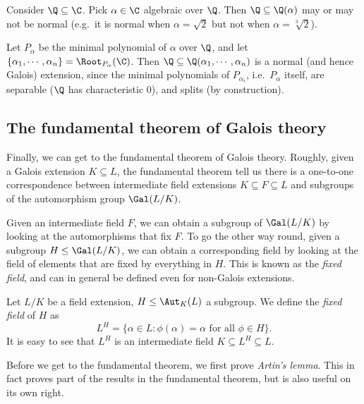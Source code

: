 \documentclass[a4paper]{article}
\begin{document}
\begin{eg}
  Consider $\Q \subseteq \C$. Pick $\alpha \in \C$ algebraic over $\Q$. Then $\Q \subseteq \Q(\alpha)$ may or may not be normal (e.g.\ it is normal when $\alpha = \sqrt{2}$ but not when $\alpha = \sqrt[3]{2}$).

  Let $P_\alpha$ be the minimal polynomial of $\alpha$ over $\Q$, and let $\{\alpha_1, \cdots, \alpha_n\} = \Root_{P_\alpha}(\C)$. Then $\Q\subseteq \Q(\alpha_1, \cdots, \alpha_n)$ is a normal (and hence Galois) extension, since the minimal polynomials of $P_{\alpha_i}$, i.e.\ $P_\alpha$ itself, are separable ($\Q$ has characteristic 0), and splits (by construction).
\end{eg}
\subsection{The fundamental theorem of Galois theory}
Finally, we can get to the fundamental theorem of Galois theory. Roughly, given a Galois extension $K \subseteq L$, the fundamental theorem tell us there is a one-to-one correspondence between intermediate field extensions $K \subseteq F \subseteq L$ and subgroups of the automorphism group $\Gal(L/K)$.

Given an intermediate field $F$, we can obtain a subgroup of $\Gal(L/K)$ by looking at the automorphisms that fix $F$. To go the other way round, given a subgroup $H \leq \Gal(L/K)$, we can obtain a corresponding field by looking at the field of elements that are fixed by everything in $H$. This is known as the \emph{fixed field}, and can in general be defined even for non-Galois extensions.

\begin{defi}
  Let $L/K$ be a field extension, $H\leq \Aut_K(L)$ a subgroup. We define the \emph{fixed field} of $H$ as
  \[
    L^H = \{\alpha \in L: \phi(\alpha) = \alpha\text{ for all }\phi \in H\}.
  \]
  It is easy to see that $L^H$ is an intermediate field $K\subseteq L^H \subseteq L$.
\end{defi}

Before we get to the fundamental theorem, we first prove \emph{Artin's lemma}. This in fact proves part of the results in the fundamental theorem, but is also useful on its own right.
\end{document}
